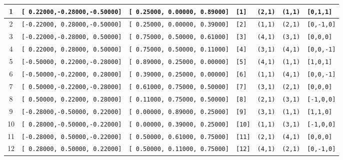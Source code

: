 \documentclass[fleqn,10pt,landscape]{jsarticle}
\begin{document}
\begin{longtable}[l]{cllllll}
1 & \texttt{[ 0.22000,-0.28000,-0.50000]} & \texttt{[ 0.25000, 0.00000, 0.89000]} & \texttt{[1]} & \texttt{(2,1)} & \texttt{(1,1)} & \texttt{[0,1,1]} \\ \hline
2 & \texttt{[-0.22000, 0.28000,-0.50000]} & \texttt{[ 0.25000, 0.00000, 0.39000]} & \texttt{[2]} & \texttt{(1,1)} & \texttt{(2,1)} & \texttt{[0,-1,0]} \\ \hline
3 & \texttt{[-0.22000,-0.28000, 0.50000]} & \texttt{[ 0.75000, 0.50000, 0.61000]} & \texttt{[3]} & \texttt{(4,1)} & \texttt{(3,1)} & \texttt{[0,0,0]} \\ \hline
4 & \texttt{[ 0.22000, 0.28000, 0.50000]} & \texttt{[ 0.75000, 0.50000, 0.11000]} & \texttt{[4]} & \texttt{(3,1)} & \texttt{(4,1)} & \texttt{[0,0,-1]} \\ \hline
5 & \texttt{[-0.50000, 0.22000,-0.28000]} & \texttt{[ 0.89000, 0.25000, 0.00000]} & \texttt{[5]} & \texttt{(4,1)} & \texttt{(1,1)} & \texttt{[1,0,1]} \\ \hline
6 & \texttt{[-0.50000,-0.22000, 0.28000]} & \texttt{[ 0.39000, 0.25000, 0.00000]} & \texttt{[6]} & \texttt{(1,1)} & \texttt{(4,1)} & \texttt{[0,0,-1]} \\ \hline
7 & \texttt{[ 0.50000,-0.22000,-0.28000]} & \texttt{[ 0.61000, 0.75000, 0.50000]} & \texttt{[7]} & \texttt{(3,1)} & \texttt{(2,1)} & \texttt{[0,0,0]} \\ \hline
8 & \texttt{[ 0.50000, 0.22000, 0.28000]} & \texttt{[ 0.11000, 0.75000, 0.50000]} & \texttt{[8]} & \texttt{(2,1)} & \texttt{(3,1)} & \texttt{[-1,0,0]} \\ \hline
9 & \texttt{[-0.28000,-0.50000, 0.22000]} & \texttt{[ 0.00000, 0.89000, 0.25000]} & \texttt{[9]} & \texttt{(3,1)} & \texttt{(1,1)} & \texttt{[1,1,0]} \\ \hline
10 & \texttt{[ 0.28000,-0.50000,-0.22000]} & \texttt{[ 0.00000, 0.39000, 0.25000]} & \texttt{[10]} & \texttt{(1,1)} & \texttt{(3,1)} & \texttt{[-1,0,0]} \\ \hline
11 & \texttt{[-0.28000, 0.50000,-0.22000]} & \texttt{[ 0.50000, 0.61000, 0.75000]} & \texttt{[11]} & \texttt{(2,1)} & \texttt{(4,1)} & \texttt{[0,0,0]} \\ \hline
12 & \texttt{[ 0.28000, 0.50000, 0.22000]} & \texttt{[ 0.50000, 0.11000, 0.75000]} & \texttt{[12]} & \texttt{(4,1)} & \texttt{(2,1)} & \texttt{[0,-1,0]} \\
\end{longtable}
\end{document}
